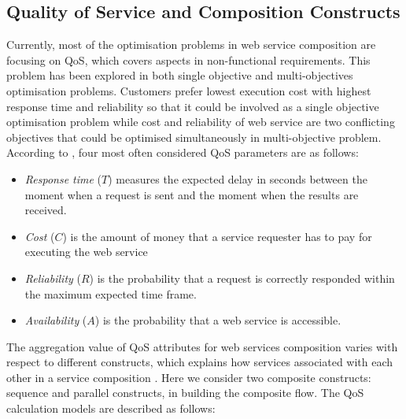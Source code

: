 \documentclass{llncs}
\begin{document}
\subsection{Quality of Service and Composition Constructs}\label{Quality of Service and Composition Constructs}
Currently, most of the optimisation problems \cite{feng2013dynamic,huang2009effective,ma2015hybrid,da2014graph} in web service composition are focusing on QoS, which covers aspects in non-functional requirements. This problem has been explored in both single objective and multi-objectives optimisation problems. Customers prefer lowest execution cost with highest response time and reliability so that it could be involved as a single objective optimisation problem while cost and reliability of web service are two conflicting objectives that could be optimised simultaneously in multi-objective problem. According to \cite{zeng2003quality}, four most often considered QoS parameters are as follows:
\begin{itemize}
\item \textit{Response time} ($T$) measures the expected delay in seconds between the moment when a request is sent and the moment when the results are received.
\item \textit{Cost} ($C$) is the amount of money that a service requester has to pay for executing the web service
\item \textit{Reliability} ($R$) is the probability that a request is correctly responded within the maximum expected time frame.
\item \textit{Availability} ($A$) is the probability that a web service is accessible.
\end{itemize}
The aggregation value of QoS attributes for web services composition varies with respect to different constructs, which explains how services associated with each other in a service composition \cite{zeng2003quality}. Here we consider two composite constructs: sequence and parallel constructs, in building the composite flow. The QoS calculation models are described as follows:
\end{document}
